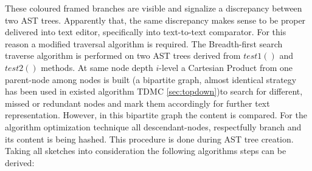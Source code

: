 \documentclass{report}
\begin{document}
These coloured framed branches are visible and signalize a discrepancy between two AST trees. Apparently that, the same discrepancy makes sense to be proper delivered into text editor,  specifically into text-to-text comparator. For this reason a modified traversal algorithm is required. The Breadth-first search traverse algorithm is performed on two AST trees derived from $test1()$ and $test2()$ methods. At same node depth $i$-level a Cartesian Product from one parent-node among nodes is built (a bipartite graph, almost identical strategy has been used in existed algorithm TDMC \ref{sec:topdown})to search for different, missed or redundant nodes and mark them accordingly for further text representation. However, in this bipartite graph the content is compared. For the algorithm optimization technique all descendant-nodes, respectfully branch and its content is being hashed. This procedure is done during AST tree creation. 
\\
Taking all sketches into consideration  the following algorithms steps can be derived:
\end{document}
